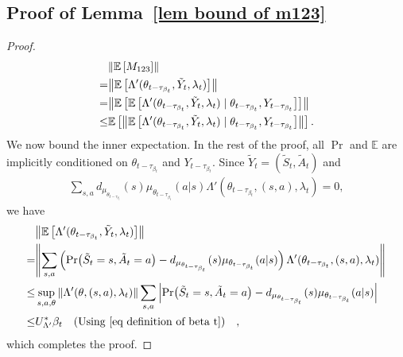 \documentclass[twoside,11pt]{article}
\newcommand{\E}{\mathbb{E}}
\numberwithin{assucounter}{section}
\begin{document}
\subsection{Proof of Lemma~\ref{lem bound of m123}}
\label{sec proof lem bound of m123}
\lemboundofmonetwothree*
\begin{proof}
  \begin{align}
    &\norm{\E\left[M_{123}\right]} \\
    =&\norm{\E\left[\Lambda'(\theta_{t-\tau_{\beta_t}}, \tilde Y_t, \lambda_t)\right]} \\
    =&\norm{\E\left[\E\left[\Lambda'(\theta_{t-\tau_{\beta_t}}, \tilde Y_t, \lambda_t)\mid \theta_{t-\tau_{\beta_t}}, Y_{t-\tau_{\beta_t}}\right]\right]} \\
    \leq &\E\left[\norm{\E\left[\Lambda'(\theta_{t-\tau_{\beta_t}}, \tilde Y_t, \lambda_t)\mid \theta_{t-\tau_{\beta_t}}, Y_{t-\tau_{\beta_t}}\right]}\right].
  \end{align}
  We now bound the inner expectation.
  In the rest of the proof, 
  all $\Pr$ and $\E$ are implicitly conditioned on $\theta_{t-\tau_{\beta_t}}$ and $Y_{t-\tau_{\beta_t}}$. 
  Since $\tilde Y_t = (\tilde S_t, \tilde A_t)$ and 
  \begin{align}
    \sum_{s, a} d_{\mu_{\theta_{t-\tau_{\beta_t}}}}(s) \mu_{\theta_{t-\tau_{\beta_t}}}(a|s) \Lambda'(\theta_{t-\tau_{\beta_t}}, (s, a), \lambda_t) = 0,
  \end{align}
  we have
  \begin{align}
    &\norm{\E\left[\Lambda'(\theta_{t-\tau_{\beta_t}}, \tilde Y_t, \lambda_t)\right]} \\
    =& \norm{\sum_{s, a} \left(\Pr(\tilde S_t = s, \tilde A_t = a) - d_{\mu_{\theta_{t-\tau_{\beta_t}}}}(s) \mu_{\theta_{t-\tau_{\beta_t}}}(a|s)\right) \Lambda'(\theta_{t-\tau_{\beta_t}}, (s, a), \lambda_t)} \\
    \leq& \sup_{s, a, \theta} \norm{\Lambda'(\theta, (s, a), \lambda_t)} \sum_{s, a} \abs{\Pr(\tilde S_t = s, \tilde A_t = a) - d_{\mu_{\theta_{t-\tau_{\beta_t}}}}(s) \mu_{\theta_{t-\tau_{\beta_t}}}(a|s)} \\
    \leq& U_{\Lambda'}^* \beta_t \qq{(Using \eqref{eq definition of beta t})},
  \end{align}
  which completes the proof.
\end{proof}
\end{document}
